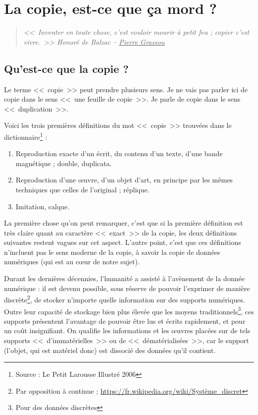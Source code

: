 \chapter{La copie, est-ce que ça mord ?}

\begin{quote}
\textit{{\Large <<~Inventer en toute chose, c'est vouloir mourir à petit feu ; copier c'est vivre.~>>} Honoré de Balzac -- \underline{Pierre Grassou}}
\end{quote}

\section{Qu'est-ce que la copie ?}

Le terme <<~copie~>> peut prendre plusieurs sens. Je ne vais pas parler ici de copie dans le sens <<~une feuille de copie~>>. Je parle de copie dans le sens <<~duplication~>>.

Voici les trois premières définitions du mot <<~copie~>> trouvées dans le dictionnaire\footnote{Source : Le Petit Larousse Illustré 2006} :
\begin{enumerate}
\item Reproduction exacte d'un écrit, du contenu d'un texte, d'une bande magnétique ; double, duplicata.
\item Reproduction d'une œuvre, d'un objet d'art, en principe par les mêmes techniques que celles de l'original ; réplique.
\item Imitation, calque.
\end{enumerate}\bigskip

La première chose qu'on peut remarquer, c'est que si la première définition est très claire quant au caractère <<~exact~>> de la copie, les deux définitions suivantes restent vagues sur cet aspect.
L'autre point, c'est que ces définitions n'incluent pas le sens moderne de la copie, à savoir la copie de données numériques (qui est au cœur de notre sujet).

Durant les dernières décennies, l'humanité a assisté à l'avènement de la donnée numérique : il est devenu possible, sous réserve de pouvoir l'exprimer de manière discrète\footnote{Par opposition à continue ; \url{https://fr.wikipedia.org/wiki/Système_discret}}, de stocker n'importe quelle information sur des supports numériques.
Outre leur capacité de stockage bien plus élevée que les moyens traditionnels\footnote{Pour des données discrètes}, ces supports présentent l'avantage de pouvoir être lus et écrits rapidement, et pour un coût insignifiant.
On qualifie les informations et les œuvres placées sur de tels supports <<~d'immatérielles~>> ou de <<~dématérialisées~>>, car le support (l'objet, qui est matériel donc) est dissocié des données qu'il contient.

